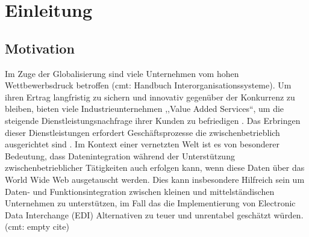 \section{Einleitung}
\subsection{Motivation}
Im Zuge der Globalisierung sind viele Unternehmen vom hohen Wettbewerbsdruck betroffen (cmt: Handbuch Interorganisationssysteme). Um ihren Ertrag langfristig zu sichern und innovativ gegenüber der Konkurrenz zu bleiben, bieten viele Industrieunternehmen ,,Value Added Services``, um die steigende Dienstleistungsnachfrage ihrer Kunden zu befriedigen \citep[vgl.][S. 4]{Meffert2015}. Das Erbringen dieser Dienstleistungen erfordert Geschäftsprozesse die zwischenbetrieblich ausgerichtet sind \parencite[vgl.][S.19]{fleisch2001netzwerkunternehmen}. Im Kontext einer vernetzten Welt \parencite[vgl.]{bmwi2013} ist es von besonderer Bedeutung, dass Datenintegration während der Unterstützung zwischenbetrieblicher Tätigkeiten auch erfolgen kann, wenn diese Daten über das World Wide Web ausgetauscht werden. Dies kann insbesondere Hilfreich sein um Daten- und Funktionsintegration zwischen kleinen und mittelständischen Unternehmen zu unterstützen, im Fall das die Implementierung von Electronic Data Interchange (EDI) Alternativen zu teuer und unrentabel geschätzt würden. (cmt: empty cite)

